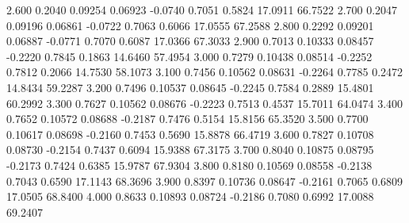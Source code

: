    2.600   0.2040   0.09254   0.06923  -0.0740   0.7051   0.5824  17.0911  66.7522
   2.700   0.2047   0.09196   0.06861  -0.0722   0.7063   0.6066  17.0555  67.2588
   2.800   0.2292   0.09201   0.06887  -0.0771   0.7070   0.6087  17.0366  67.3033
   2.900   0.7013   0.10333   0.08457  -0.2220   0.7845   0.1863  14.6460  57.4954
   3.000   0.7279   0.10438   0.08514  -0.2252   0.7812   0.2066  14.7530  58.1073
   3.100   0.7456   0.10562   0.08631  -0.2264   0.7785   0.2472  14.8434  59.2287
   3.200   0.7496   0.10537   0.08645  -0.2245   0.7584   0.2889  15.4801  60.2992
   3.300   0.7627   0.10562   0.08676  -0.2223   0.7513   0.4537  15.7011  64.0474
   3.400   0.7652   0.10572   0.08688  -0.2187   0.7476   0.5154  15.8156  65.3520
   3.500   0.7700   0.10617   0.08698  -0.2160   0.7453   0.5690  15.8878  66.4719
   3.600   0.7827   0.10708   0.08730  -0.2154   0.7437   0.6094  15.9388  67.3175
   3.700   0.8040   0.10875   0.08795  -0.2173   0.7424   0.6385  15.9787  67.9304
   3.800   0.8180   0.10569   0.08558  -0.2138   0.7043   0.6590  17.1143  68.3696
   3.900   0.8397   0.10736   0.08647  -0.2161   0.7065   0.6809  17.0505  68.8400
   4.000   0.8633   0.10893   0.08724  -0.2186   0.7080   0.6992  17.0088  69.2407
